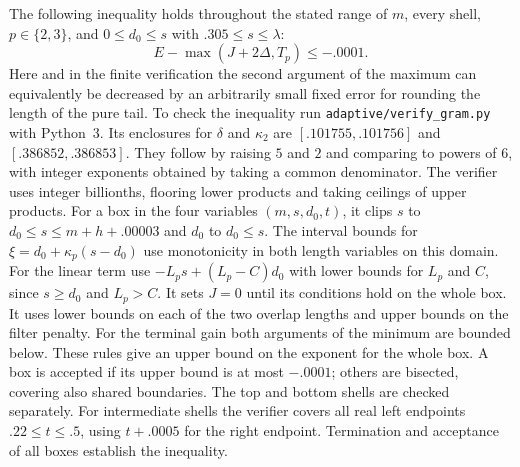 \documentclass[11pt,a4paper]{article}
\theoremstyle{paperplain}
\numberwithin{equation}{section}
\begin{document}
The following inequality holds throughout the stated range of
$m$, every shell, $p\in\{2,3\}$, and $0\le d_0\le s$ with
$.305\le s\le\lambda$:
\[
                       E-\max(J+2\Delta,T_p)\le-.0001 .
\]
Here and in the finite verification the second argument of the
maximum can equivalently be decreased by an arbitrarily small fixed
error for rounding the length of the pure tail. To check the
inequality run \texttt{adaptive/verify\_gram.py} with Python~3.
Its enclosures for $\delta$ and $\kappa_2$ are
$[.101755,.101756]$ and $[.386852,.386853]$. They follow by
raising $5$ and $2$ and comparing to powers of $6$, with integer
exponents obtained by taking a common denominator. The verifier
uses integer billionths, flooring lower products and taking ceilings
of upper products. For a box in the four variables $(m,s,d_0,t)$,
it clips $s$ to $d_0\le s\le m+h+.00003$ and $d_0$ to $d_0\le s$.
The interval bounds for $\xi=d_0+\kappa_p(s-d_0)$ use monotonicity
in both length variables on this domain. For the linear term use
$-L_ps+(L_p-C)d_0$ with lower bounds for $L_p$ and $C$, since
$s\ge d_0$ and $L_p>C$. It sets $J=0$ until its conditions hold
on the whole box. It uses lower bounds on each of the two overlap
lengths and upper bounds on the filter penalty. For the terminal
gain both arguments of the minimum are bounded below. These rules
give an upper bound on the exponent for the whole box. A box is
accepted if its upper bound is at most $-.0001$; others are
bisected, covering also shared boundaries. The top and bottom
shells are checked separately. For intermediate shells the
verifier covers all real left endpoints $.22\le t\le .5$, using
$t+.0005$ for the right endpoint. Termination and acceptance of
all boxes establish the inequality.
\end{document}
